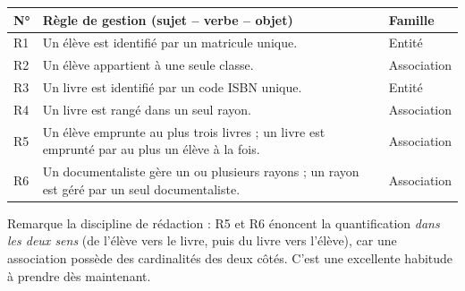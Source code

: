 \documentclass[11pt]{article}
\begin{document}
\begin{center}
\begin{tabularx}{\linewidth}{|l|X|l|}
\hline
\rowcolor{popblueL}
\textbf{N°} & \textbf{Règle de gestion (sujet -- verbe -- objet)} & \textbf{Famille} \\
\hline
R1 & Un élève est identifié par un matricule unique. & Entité \\
\hline
R2 & Un élève appartient à une seule classe. & Association \\
\hline
R3 & Un livre est identifié par un code ISBN unique. & Entité \\
\hline
R4 & Un livre est rangé dans un seul rayon. & Association \\
\hline
R5 & Un élève emprunte au plus trois livres ; un livre est emprunté par au plus un élève à la fois. & Association \\
\hline
R6 & Un documentaliste gère un ou plusieurs rayons ; un rayon est géré par un seul documentaliste. & Association \\
\hline
\end{tabularx}
\end{center}

Remarque la discipline de rédaction : R5 et R6 énoncent la quantification \emph{dans les deux sens} (de l'élève vers le livre, puis du livre vers l'élève), car une association possède des cardinalités des deux côtés. C'est une excellente habitude à prendre dès maintenant.
\end{document}
